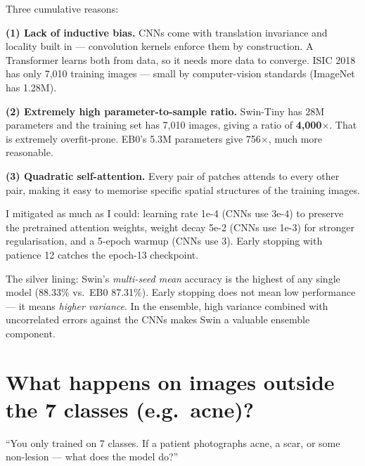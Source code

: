 \documentclass[11pt,a4paper]{article}
\begin{document}
\begin{answer}
Three cumulative reasons:

\textbf{(1) Lack of inductive bias.} CNNs come with translation invariance and locality built in --- convolution kernels enforce them by construction. A Transformer learns both from data, so it needs more data to converge. ISIC 2018 has only 7{,}010 training images --- small by computer-vision standards (ImageNet has 1.28M).

\textbf{(2) Extremely high parameter-to-sample ratio.} Swin-Tiny has 28M parameters and the training set has 7{,}010 images, giving a ratio of \textbf{4{,}000$\times$}. That is extremely overfit-prone. EB0's 5.3M parameters give 756$\times$, much more reasonable.

\textbf{(3) Quadratic self-attention.} Every pair of patches attends to every other pair, making it easy to memorise specific spatial structures of the training images.

I mitigated as much as I could: learning rate 1e-4 (CNNs use 3e-4) to preserve the pretrained attention weights, weight decay 5e-2 (CNNs use 1e-3) for stronger regularisation, and a 5-epoch warmup (CNNs use 3). Early stopping with patience 12 catches the epoch-13 checkpoint.

The silver lining: Swin's \textit{multi-seed mean} accuracy is the highest of any single model (88.33\% vs.\ EB0 87.31\%). Early stopping does not mean low performance --- it means \textit{higher variance}. In the ensemble, high variance combined with uncorrelated errors against the CNNs makes Swin a valuable ensemble component.
\end{answer}

\section{What happens on images outside the 7 classes (e.g.\ acne)?}

\begin{question}
``You only trained on 7 classes. If a patient photographs acne, a scar, or some non-lesion --- what does the model do?''
\end{question}
\end{document}
